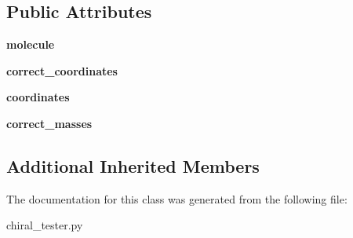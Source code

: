 \subsection*{Public Attributes}
\begin{DoxyCompactItemize}
\item 
\hypertarget{classchiral__tester_1_1read__molecule__test_a527090ddc7f30f058cbbd84a830e744d}{{\bfseries molecule}}\label{classchiral__tester_1_1read__molecule__test_a527090ddc7f30f058cbbd84a830e744d}

\item 
\hypertarget{classchiral__tester_1_1read__molecule__test_a737337aaea450f8b30d15f9cd6c10c23}{{\bfseries correct\+\_\+coordinates}}\label{classchiral__tester_1_1read__molecule__test_a737337aaea450f8b30d15f9cd6c10c23}

\item 
\hypertarget{classchiral__tester_1_1read__molecule__test_a827a4cfa7aebc4f347034daade46d1ba}{{\bfseries coordinates}}\label{classchiral__tester_1_1read__molecule__test_a827a4cfa7aebc4f347034daade46d1ba}

\item 
\hypertarget{classchiral__tester_1_1read__molecule__test_ad9c2f5342740e78ee4852b16407c2649}{{\bfseries correct\+\_\+masses}}\label{classchiral__tester_1_1read__molecule__test_ad9c2f5342740e78ee4852b16407c2649}

\end{DoxyCompactItemize}
\subsection*{Additional Inherited Members}


The documentation for this class was generated from the following file\+:\begin{DoxyCompactItemize}
\item 
chiral\+\_\+tester.\+py\end{DoxyCompactItemize}
